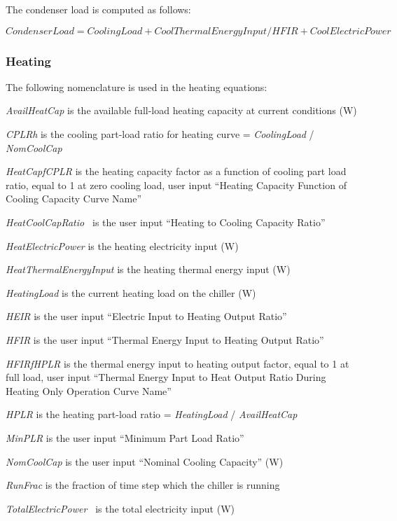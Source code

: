 The condenser load is computed as follows:

\begin{equation}
CondenserLoad = CoolingLoad + CoolThermalEnergyInput/HFIR + CoolElectricPower
\end{equation}

\subsubsection{Heating}\label{heating-1}

The following nomenclature is used in the heating equations:

\emph{AvailHeatCap} is the available full-load heating capacity at current conditions (W)

\emph{CPLRh} is the cooling part-load ratio for heating curve = \emph{CoolingLoad} / \emph{NomCoolCap}

\emph{HeatCapfCPLR} is the heating capacity factor as a function of cooling part load ratio, equal to 1 at zero cooling load, user input ``Heating Capacity Function of Cooling Capacity Curve Name''

\emph{HeatCoolCapRatio~} is the user input ``Heating to Cooling Capacity Ratio''

\emph{HeatElectricPower} is the heating electricity input (W)

\emph{HeatThermalEnergyInput} is the heating thermal energy input (W)

\emph{HeatingLoad} is the current heating load on the chiller (W)

\emph{HEIR} is the user input ``Electric Input to Heating Output Ratio''

\emph{HFIR} is the user input ``Thermal Energy Input to Heating Output Ratio''

\emph{HFIRfHPLR} is the thermal energy input to heating output factor, equal to 1 at full load, user input ``Thermal Energy Input to Heat Output Ratio During Heating Only Operation Curve Name''

\emph{HPLR} is the heating part-load ratio = \emph{HeatingLoad} / \emph{AvailHeatCap}

\emph{MinPLR} is the user input ``Minimum Part Load Ratio''

\emph{NomCoolCap} is the user input ``Nominal Cooling Capacity'' (W)

\emph{RunFrac} is the fraction of time step which the chiller is running

\emph{TotalElectricPower~} is the total electricity input (W)

